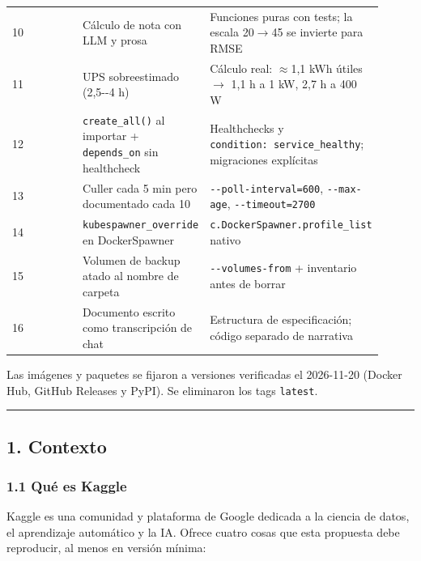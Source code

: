 \documentclass[11pt,a4paper]{article}
\begin{document}
\begin{longtable}[]{@{}p{0.302\linewidth}p{0.302\linewidth}p{0.302\linewidth}@{}}
10 & Cálculo de nota con LLM y prosa & Funciones puras con tests; la escala 20\(\to\)45 se invierte para RMSE \\
11 & UPS sobreestimado (2,5-\/-4 h) & Cálculo real: \(\approx\)1,1 kWh útiles \(\to\) 1,1 h a 1 kW, 2,7 h a 400 W \\
12 & \texttt{create\_\allowbreak{}all()} al importar + \texttt{depends\_\allowbreak{}on} sin healthcheck & Healthchecks y \texttt{condition:\allowbreak{}\ service\_\allowbreak{}healthy}; migraciones explícitas \\
13 & Culler cada 5 min pero documentado cada 10 & \texttt{-\allowbreak{}\/\allowbreak{}-\allowbreak{}poll-\allowbreak{}interval=600}, \texttt{-\allowbreak{}\/\allowbreak{}-\allowbreak{}max-\allowbreak{}age}, \texttt{-\allowbreak{}\/\allowbreak{}-\allowbreak{}timeout=2700} \\
14 & \texttt{kubespawner\_\allowbreak{}override} en DockerSpawner & \texttt{c.\allowbreak{}DockerSpawner.\allowbreak{}profile\_\allowbreak{}list} nativo \\
15 & Volumen de backup atado al nombre de carpeta & \texttt{-\allowbreak{}\/\allowbreak{}-\allowbreak{}volumes-\allowbreak{}from} + inventario antes de borrar \\
16 & Documento escrito como transcripción de chat & Estructura de especificación; código separado de narrativa \\
\bottomrule
\end{longtable}

Las imágenes y paquetes se fijaron a versiones verificadas el 2026-11-20 (Docker Hub, GitHub Releases y PyPI). Se eliminaron los tags \texttt{latest}.

\begin{center}\rule{0.5\linewidth}{0.5pt}\end{center}

\hypertarget{1-contexto}{%
\subsection{1. Contexto}\label{1-contexto}}

\hypertarget{11-quuxe9-es-kaggle}{%
\subsubsection{1.1 Qué es Kaggle}\label{11-quuxe9-es-kaggle}}

Kaggle es una comunidad y plataforma de Google dedicada a la ciencia de datos, el aprendizaje automático y la IA. Ofrece cuatro cosas que esta propuesta debe reproducir, al menos en versión mínima:
\end{document}

